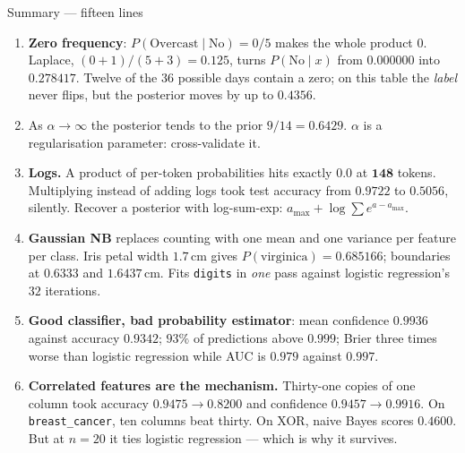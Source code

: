 \documentclass[aspectratio=169]{beamer}
\begin{document}
\begin{frame}[shrink=18]{Summary --- fifteen lines}
\begin{enumerate}
      $P(\text{No} \mid x) = \mathbf{0.795417}$ --- and
      \texttt{CategoricalNB} agrees to $7.68\times10^{-12}$.
    \item \textbf{Zero frequency}: $P(\text{Overcast} \mid \text{No}) = 0/5$
      makes the whole product $0$. Laplace, $(0+1)/(5+3) = 0.125$, turns
      $P(\text{No} \mid x)$ from $\mathbf{0.000000}$ into
      $\mathbf{0.278417}$. Twelve of the $36$ possible days contain a zero;
      on this table the \emph{label} never flips, but the posterior moves by
      up to $0.4356$.
    \item As $\alpha \to \infty$ the posterior tends to the prior $9/14 =
      0.6429$. $\alpha$ is a regularisation parameter: cross-validate it.
    \item \textbf{Logs.} A product of per-token probabilities hits exactly
      $0.0$ at $\mathbf{148}$ tokens. Multiplying instead of adding logs took
      test accuracy from $0.9722$ to $\mathbf{0.5056}$, silently. Recover a
      posterior with log-sum-exp: $a_{\max} + \log\sum e^{a - a_{\max}}$.
    \item \textbf{Gaussian NB} replaces counting with one mean and one
      variance per feature per class. Iris petal width $1.7$\,cm gives
      $P(\text{virginica}) = 0.685166$; boundaries at $0.6333$ and
      $1.6437$\,cm. Fits \texttt{digits} in \emph{one} pass against
      logistic regression's $32$ iterations.
    \item \textbf{Good classifier, bad probability estimator}: mean
      confidence $\mathbf{0.9936}$ against accuracy $\mathbf{0.9342}$; $93\%$
      of predictions above $0.999$; Brier three times worse than logistic
      regression while AUC is $0.979$ against $0.997$.
    \item \textbf{Correlated features are the mechanism.} Thirty-one copies
      of one column took accuracy $0.9475 \to 0.8200$ and confidence
      $0.9457 \to 0.9916$. On \texttt{breast\_cancer}, ten columns beat
      thirty. On XOR, naive Bayes scores $0.4600$. But at $n=20$ it ties
      logistic regression --- which is why it survives.
  \end{enumerate}
\end{frame}
\end{document}
